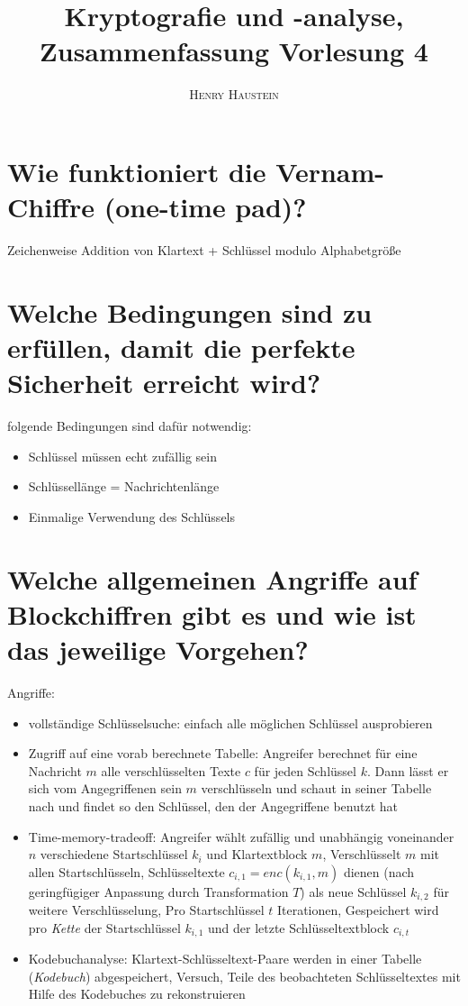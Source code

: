 \documentclass{article}
\title{\textbf{Kryptografie und -analyse, Zusammenfassung Vorlesung 4}}
\author{\textsc{Henry Haustein}}
\date{}
\begin{document}
	\maketitle
	
	\section*{Wie funktioniert die Vernam-Chiffre (one-time pad)?}
	Zeichenweise Addition von Klartext + Schlüssel modulo Alphabetgröße

	\section*{Welche Bedingungen sind zu erfüllen, damit die perfekte Sicherheit erreicht wird?}
	folgende Bedingungen sind dafür notwendig:
	\begin{itemize}
		\item Schlüssel müssen echt zufällig sein
		\item Schlüssellänge = Nachrichtenlänge
		\item Einmalige Verwendung des Schlüssels
	\end{itemize}
	
	\section*{Welche allgemeinen Angriffe auf Blockchiffren gibt es und wie ist das jeweilige Vorgehen?}
	Angriffe:
	\begin{itemize}
		\item vollständige Schlüsselsuche: einfach alle möglichen Schlüssel ausprobieren
		\item Zugriff auf eine vorab berechnete Tabelle: Angreifer berechnet für eine Nachricht $m$ alle verschlüsselten Texte $c$ für jeden Schlüssel $k$. Dann lässt er sich vom Angegriffenen sein $m$ verschlüsseln und schaut in seiner Tabelle nach und findet so den Schlüssel, den der Angegriffene benutzt hat
		\item Time-memory-tradeoff: Angreifer wählt zufällig und unabhängig voneinander $n$ verschiedene Startschlüssel $k_i$ und Klartextblock $m$, Verschlüsselt $m$ mit allen Startschlüsseln, Schlüsseltexte $c_{i,1} = enc(k_{i,1},m)$ dienen (nach geringfügiger Anpassung durch Transformation $T$) als neue Schlüssel $k_{i,2}$ für weitere Verschlüsselung, Pro Startschlüssel $t$ Iterationen, Gespeichert wird pro \textit{Kette} der Startschlüssel $k_{i,1}$ und der letzte Schlüsseltextblock $c_{i,t}$
		\item Kodebuchanalyse: Klartext-Schlüsseltext-Paare werden in einer Tabelle (\textit{Kodebuch}) abgespeichert, Versuch, Teile des beobachteten Schlüsseltextes mit Hilfe des Kodebuches zu rekonstruieren
	\end{itemize}
	
\end{document}
